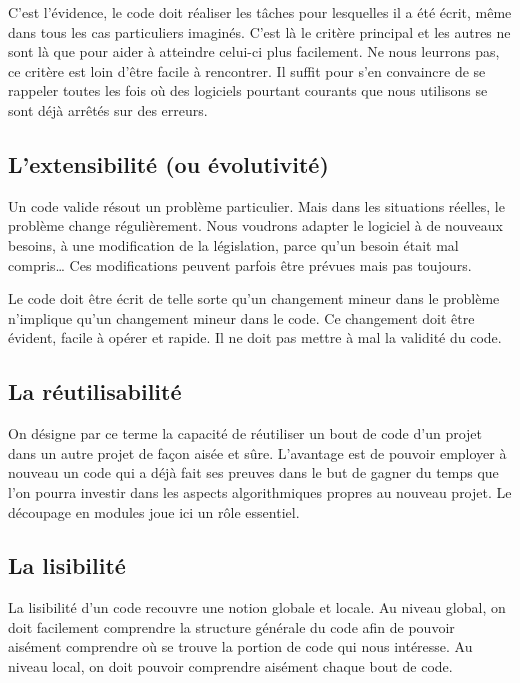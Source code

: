 		C’est l’évidence, le code doit réaliser les tâches 
		pour lesquelles il a été écrit, 
		même dans tous les cas particuliers imaginés. 
		C’est là le critère principal et les autres ne sont là 
		que pour aider à atteindre celui-ci plus facilement. 
		Ne nous leurrons pas, 
		ce critère est loin d’être facile à rencontrer. 
		Il suffit pour s’en convaincre de se rappeler toutes les fois 
		où des logiciels pourtant courants que nous utilisons 
		se sont déjà arrêtés sur des erreurs.
	
	\subsection{L’extensibilité (ou évolutivité)}
	
		Un code valide résout un problème particulier. 
		Mais dans les situations réelles, 
		le problème change régulièrement. 
		Nous voudrons adapter le logiciel à de nouveaux besoins, 
		à une modification de la législation,
		parce qu’un besoin était mal compris\dots{}
		Ces modifications peuvent parfois être prévues mais pas toujours.
	
		Le code doit être écrit de telle sorte qu’un changement
		mineur dans le problème n’implique
		qu’un changement mineur dans le code. 
		Ce changement doit être évident, facile à opérer et rapide. 
		Il ne doit pas mettre à mal la validité du code.
	
	\subsection{La réutilisabilité}
	
		On désigne par ce terme la capacité de réutiliser 
		un bout de code d’un projet dans un autre projet de 
		façon aisée et sûre. L’avantage est de pouvoir employer 
		à nouveau un code qui a déjà fait ses preuves dans le 
		but de gagner du temps que l’on pourra investir dans les 
		aspects algorithmiques propres au nouveau projet. 
		Le découpage en modules joue ici un rôle essentiel.
	
	\subsection{La lisibilité}
	
		La lisibilité d’un code recouvre une notion globale et locale. 
		Au niveau global, on doit facilement comprendre 
		la structure générale du code 
		afin de pouvoir aisément comprendre 
		où se trouve la portion de code qui nous intéresse. 
		Au niveau local, on doit pouvoir comprendre
		aisément chaque bout de code.
	
